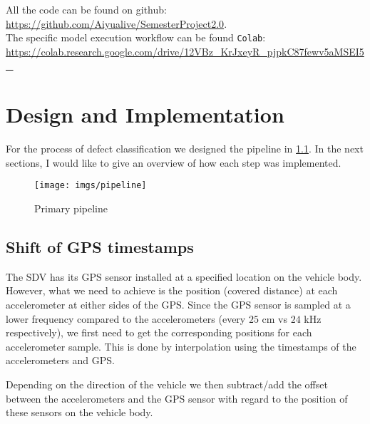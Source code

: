 \noindent All the code can be found on github: \\
\url{https://github.com/Aiyualive/SemesterProject2.0}.\\

\noindent The specific model execution workflow can be found \verb|Colab|:\\
\url{https://colab.research.google.com/drive/12VBz_KrJxeyR_pjpkC87fewv5aMSEI5_}



\chapter{Design and Implementation}

For the process of defect classification we designed the pipeline in \ref{fig:pipeline}. In the next sections, I would like to give an overview of how each step was implemented.
\begin{figure}[H]
	\centering
	\texttt{[image: imgs/pipeline]}
	\caption{Primary pipeline}
	\label{fig:pipeline}
\end{figure}




\section{Shift of GPS timestamps}
The SDV has its GPS sensor installed at a specified location on the vehicle body. However, what we need to achieve is the position (covered distance) at each accelerometer at either sides of the GPS. Since the GPS sensor is sampled at a lower frequency compared to the accelerometers (every $25$ cm vs $24$ kHz respectively), we first need to get the corresponding positions for each accelerometer sample. This is done by interpolation using the timestamps of the accelerometers and GPS. 

Depending on the direction of the vehicle we then subtract/add the offset between the accelerometers and the GPS sensor with regard to the position of these sensors on the vehicle body. 

